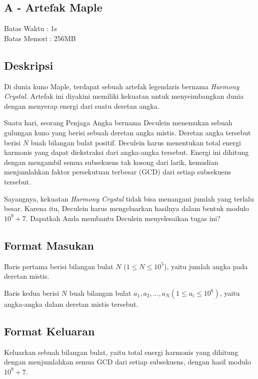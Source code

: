 \documentclass{article}
\begin{document}
\begin{center}
    \section*{A - Artefak Maple} %
    Batas Waktu : 1s \\  %
    Batas Memori :  256MB \\ %
\end{center}

\subsection*{Deskripsi}

Di dunia kuno Maple, terdapat sebuah artefak legendaris bernama \textit{Harmony Crystal}. Artefak ini diyakini memiliki kekuatan untuk menyeimbangkan dunia dengan menyerap energi dari suatu deretan angka.

Suatu hari, seorang Penjaga Angka bernama Deculein menemukan sebuah gulungan kuno yang berisi sebuah deretan angka mistis. Deretan angka tersebut berisi $N$ buah bilangan bulat positif. Deculein harus menentukan total energi harmonis yang dapat diekstraksi dari angka-angka tersebut. Energi ini dihitung dengan mengambil semua subsekuens tak kosong dari larik, kemudian menjumlahkan faktor persekutuan terbesar (GCD) dari setiap subsekuens tersebut.

Sayangnya, kekuatan \textit{Harmony Crystal} tidak bisa menangani jumlah yang terlalu besar. Karena itu, Deculein harus mengeluarkan hasilnya dalam bentuk modulo $10^9 + 7$. Dapatkah Anda membantu Deculein menyelesaikan tugas ini?

\subsection*{Format Masukan}
Baris pertama berisi bilangan bulat $N$ ($1 \leq N \leq  10^5 $), yaitu jumlah angka pada deretan mistis. 

Baris kedua berisi $N$ buah bilangan bulat $a_{1}, a_{2}, \dots, a_{N} (1 \leq a_{i} \leq 10^6)$, yaitu angka-angka dalam deretan mistis tersebut.

\subsection*{Format Keluaran}

Keluarkan sebuah bilangan bulat, yaitu total energi harmonis yang dihitung dengan menjumlahkan semua GCD dari setiap subsekuens, dengan hasil modulo $10^9 + 7$.
\end{document}
